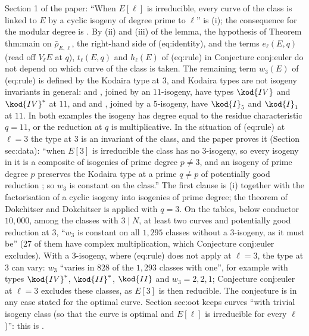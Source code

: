 \begin{paperlink}\label{pl:ellcurves:optimal}
Section 1 of the paper: ``When $E[\ell]$ is irreducible, every curve of the class is linked to $E$ by a cyclic isogeny of degree prime to $\ell$'' is
(i); the consequence for the modular degree is . By (ii) and (iii) of the lemma, the hypothesis of Theorem thm:main on $\bar\rho_{E,\ell}$, the right-hand side of (eq:identity), and
the terms $e_\ell(E,q)$ (read off $V_\ell E$ at $q$), $t_\ell(E,q)$ and $h_\ell(E)$ of (eq:rule) in Conjecture conj:euler do not depend on which curve of the class is taken. The
remaining term $w_3(E)$ of (eq:rule) is defined by the Kodaira type at $3$, and Kodaira types are not isogeny invariants in general:  and ,
joined by an $11$-isogeny, have types $\kod{IV}$ and $\kod{IV}^*$ at $11$, and  and , joined by a $5$-isogeny, have $\kod{I}_5$ and $\kod{I}_1$ at
$11$. In both examples the isogeny has degree equal to the residue characteristic $q=11$, or the reduction at $q$ is multiplicative. In the situation of (eq:rule) at $\ell=3$ the type at $3$ is
an invariant of the class, and the paper proves it (Section sec:data): ``when $E[3]$ is irreducible the class has no $3$-isogeny, so every isogeny in it is a composite of isogenies of prime
degree $p\ne3$, and an isogeny of prime degree $p$ preserves the Kodaira type at a prime $q\ne p$ of potentially good reduction \cite[Theorem 5.4(1)]{DokDok15}; so $w_3$ is constant on the
class.'' The first clause is (i) together with the factorisation of a cyclic isogeny into isogenies of prime degree; the theorem of Dokchitser and Dokchitser
is applied with $q=3$. On the tables, below conductor $10{,}000$, among the classes with $3\mid N$, at least two curves and potentially good reduction at $3$, ``$w_3$ is constant on all
$1{,}295$ classes without a $3$-isogeny, as it must be'' ($27$ of them have complex multiplication, which Conjecture conj:euler excludes). With a $3$-isogeny, where (eq:rule) does not apply
at $\ell=3$, the type at $3$ can vary: $w_3$ ``varies in $828$ of the $1{,}293$ classes with one'', for example  with types $\kod{IV}^*$, $\kod{II}^*$, $\kod{II}$ and
$w_3=2,2,1$; Conjecture conj:euler at $\ell=3$ excludes these classes, as $E[3]$ is then reducible. The conjecture is in any case stated for the optimal curve. Section sec:oot keeps curves ``with trivial isogeny class (so that the curve is optimal and $E[\ell]$
is irreducible for every $\ell$)'': this is .
\end{paperlink}

